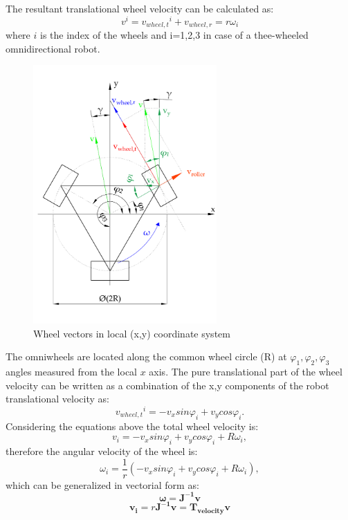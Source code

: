 \documentclass[12pt,english]{article}
\begin{document}
The resultant translational wheel velocity can be calculated as:
\begin{equation}
v^i = {v_{wheel,t}}^i + {v_{wheel,r}} = r \omega_i
\end{equation}
where $i$ is the index of the wheels and i=1,2,3 in case of a thee-wheeled omnidirectional robot.
\begin{figure}[htb!]
	\centering
	\includegraphics[width=7cm]{figures/omni_wheel_vectors}
	\caption{Wheel vectors in local (x,y) coordinate system}
	\label{omni_wheel_vectors}
\end{figure}

The omniwheels are located along the common wheel circle (R) at $\varphi_1, \varphi_2, \varphi_3$ angles measured from the local $x$ axis. The pure translational part of the wheel velocity can be written as a combination of the x,y components of the robot translational velocity as:
\begin{equation}
	{v_{wheel,t}}^i = - v_x sin \varphi_i  + v_y cos \varphi_i .
\end{equation}
Considering the equations above the total wheel velocity is:
\begin{equation}
	v_i = - v_x sin \varphi_i + v_y cos \varphi_i  + R \omega_i,
\end{equation}
therefore the angular velocity of the wheel is:
\begin{equation}
	\omega_i = \frac{1}{r} (- v_x sin \varphi_i + v_y cos \varphi_i + R \omega_i),
\end{equation}
which can be generalized in vectorial form as:
\begin{equation}
	\boldsymbol{\omega} = \mathbf{J^{-1}} \mathbf{v}
\end{equation}
\begin{equation}
\mathbf{v_i} = r \mathbf{J^{-1}} \mathbf{v} = \mathbf{T_{velocity}} \mathbf{v}
\label{velocity_tranformation}
\end{equation}
\end{document}

